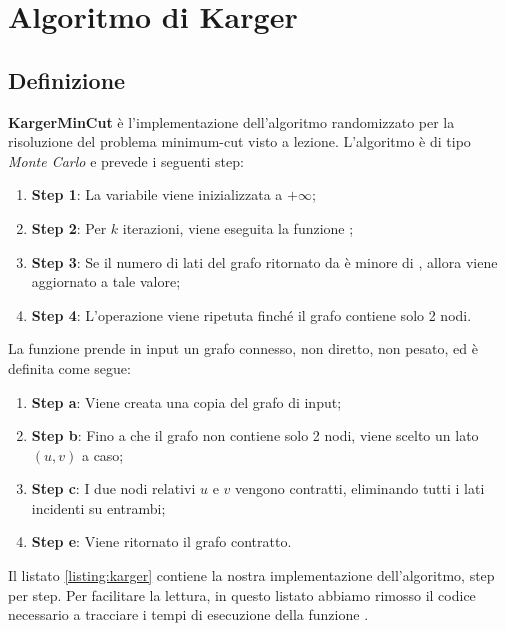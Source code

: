 \section{Algoritmo di Karger}
\label{cap:algorithm-karger}

\subsection{Definizione}
\label{sub:karger-definition}

\textbf{KargerMinCut} è l'implementazione dell'algoritmo randomizzato per la risoluzione del problema minimum-cut visto a lezione. L'algoritmo è di tipo \textit{Monte Carlo} e prevede i seguenti step:

\begin{enumerate}
    \item \textbf{Step 1}: La variabile  viene inizializzata a $+\infty$;
    \item \textbf{Step 2}: Per $k$ iterazioni, viene eseguita la funzione ;
    \item \textbf{Step 3}: Se il numero di lati del grafo ritornato da  è minore di , allora  viene aggiornato a tale valore;
    \item \textbf{Step 4}: L'operazione viene ripetuta finché il grafo contiene solo 2 nodi.
\end{enumerate}

La funzione  prende in input un grafo connesso, non diretto, non pesato, ed è definita come segue:

\begin{enumerate}
    \item \textbf{Step a}: Viene creata una copia del grafo di input;
    \item \textbf{Step b}: Fino a che il grafo non contiene solo 2 nodi, viene scelto un lato $(u, v)$ a caso;
    \item \textbf{Step c}: I due nodi relativi $u$ e $v$ vengono contratti, eliminando tutti i lati incidenti su entrambi;
    \item \textbf{Step e}: Viene ritornato il grafo contratto.
\end{enumerate}

\noindent Il listato \ref{listing:karger} contiene la nostra implementazione dell'algoritmo, step per step. Per facilitare la lettura, in questo listato abbiamo rimosso il codice necessario a tracciare i tempi di esecuzione della funzione .\\

